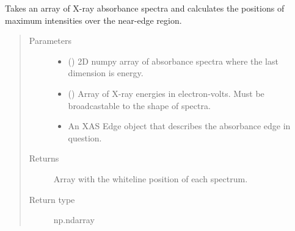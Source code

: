\documentclass[letterpaper,10pt,english]{sphinxmanual}
\begin{document}
\begin{fulllineitems}
\label{\detokenize{xanespy:xanespy.xanes_math.direct_whitelines}}
Takes an array of X-ray absorbance spectra and calculates the
positions of maximum intensities over the near-edge region.
\begin{quote}\begin{description}
\item[{Parameters}] \leavevmode\begin{itemize}
\item {} 
 () \textendash{} 2D numpy array of absorbance spectra where the last dimension is
energy.

\item {} 
 () \textendash{} Array of X-ray energies in electron-volts. Must be broadcastable
to the shape of spectra.

\item {} 
 \textendash{} An XAS Edge object that describes the absorbance edge in
question.

\end{itemize}

\item[{Returns}] \leavevmode
{} \textendash{} Array with the whiteline position of each spectrum.

\item[{Return type}] \leavevmode
np.ndarray

\end{description}\end{quote}

\end{fulllineitems}

\end{document}
